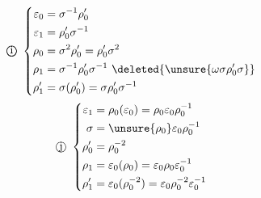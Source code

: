 \[\text{\textcircled{\textcircled{i}}}\ \left\{\begin{aligned}
\varepsilon_0&=\sigma^{-1}\rho'_0\\
\varepsilon_1&=\rho'_0\sigma^{-1}\\
\rho_0&=\sigma^2\rho'_0=\rho'_0\sigma^2\\
\rho_1&=\sigma^{-1}\rho'_0\sigma^{-1}\ \deleted{\unsure{\omega\sigma\rho'_0\sigma}}\\
\rho'_1&=\sigma(\rho'_0)=\sigma\rho'_0\sigma^{-1}
\end{aligned}\right.\]
\[\text{\textcircled{j}}\ \left\{\begin{aligned}
\varepsilon_1&=\rho_0(\varepsilon_0)=\rho_0\varepsilon_0\rho_0^{-1}\\
\sigma&=\unsure{\rho_0}\varepsilon_0\rho_0^{-1}\\
\rho'_0&=\rho_0^{-2}\\
\rho_1&=\varepsilon_0(\rho_0)=\varepsilon_0\rho_0\varepsilon_0^{-1}\\
\rho'_1&=\varepsilon_0(\rho_0^{-2})=\varepsilon_0\rho_0^{-2}\varepsilon_0^{-1}
\end{aligned}\right.\]
